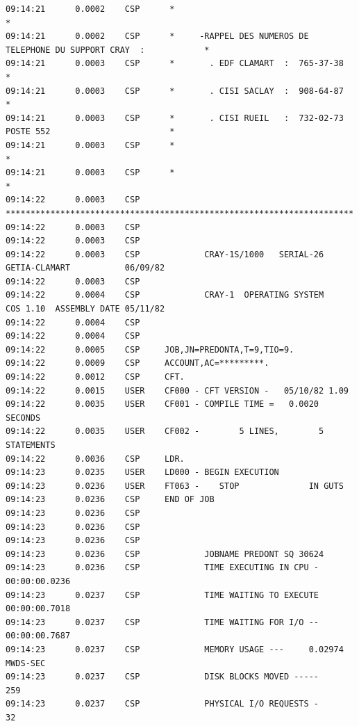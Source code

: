 {\begin{verbatim}
09:14:21      0.0002    CSP      *                                                                    *
09:14:21      0.0002    CSP      *     -RAPPEL DES NUMEROS DE TELEPHONE DU SUPPORT CRAY  :            *
09:14:21      0.0003    CSP      *       . EDF CLAMART  :  765-37-38                                  *
09:14:21      0.0003    CSP      *       . CISI SACLAY  :  908-64-87                                  *
09:14:21      0.0003    CSP      *       . CISI RUEIL   :  732-02-73 POSTE 552                        *
09:14:21      0.0003    CSP      *                                                                    *
09:14:21      0.0003    CSP      *                                                                    *
09:14:22      0.0003    CSP      **********************************************************************
09:14:22      0.0003    CSP
09:14:22      0.0003    CSP
09:14:22      0.0003    CSP             CRAY-1S/1000   SERIAL-26        GETIA-CLAMART           06/09/82
09:14:22      0.0003    CSP
09:14:22      0.0004    CSP             CRAY-1  OPERATING SYSTEM        COS 1.10  ASSEMBLY DATE 05/11/82
09:14:22      0.0004    CSP
09:14:22      0.0004    CSP
09:14:22      0.0005    CSP     JOB,JN=PREDONTA,T=9,TIO=9.
09:14:22      0.0009    CSP     ACCOUNT,AC=*********.
09:14:22      0.0012    CSP     CFT.
09:14:22      0.0015    USER    CF000 - CFT VERSION -   05/10/82 1.09
09:14:22      0.0035    USER    CF001 - COMPILE TIME =   0.0020 SECONDS
09:14:22      0.0035    USER    CF002 -        5 LINES,        5 STATEMENTS
09:14:22      0.0036    CSP     LDR.
09:14:23      0.0235    USER    LD000 - BEGIN EXECUTION
09:14:23      0.0236    USER    FT063 -    STOP              IN GUTS
09:14:23      0.0236    CSP     END OF JOB
09:14:23      0.0236    CSP
09:14:23      0.0236    CSP
09:14:23      0.0236    CSP
09:14:23      0.0236    CSP             JOBNAME PREDONT SQ 30624
09:14:23      0.0236    CSP             TIME EXECUTING IN CPU - 00:00:00.0236
09:14:23      0.0237    CSP             TIME WAITING TO EXECUTE 00:00:00.7018
09:14:23      0.0237    CSP             TIME WAITING FOR I/O -- 00:00:00.7687
09:14:23      0.0237    CSP             MEMORY USAGE ---     0.02974 MWDS-SEC
09:14:23      0.0237    CSP             DISK BLOCKS MOVED -----      259
09:14:23      0.0237    CSP             PHYSICAL I/O REQUESTS -       32
\end{verbatim}
}
